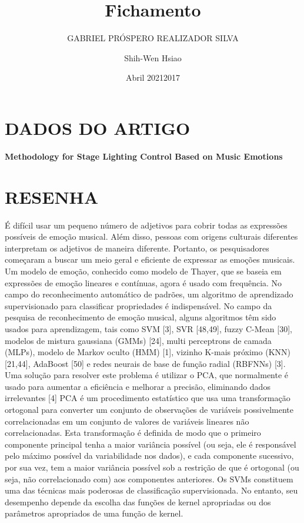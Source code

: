 \documentclass{article}
\title{Fichamento}
\author{GABRIEL PRÓSPERO REALIZADOR  SILVA}
\date{Abril 2021}
\begin{document}
\maketitle

\section{DADOS DO ARTIGO}
\textbf{Methodology for Stage Lighting Control Based on Music Emotions \\}
\author{Shih-Wen Hsiao\\}
\date{2017}

\section{RESENHA}
É difícil usar um pequeno número de adjetivos para cobrir todas as expressões possíveis de emoção musical. 
Além disso, pessoas com origens culturais diferentes interpretam os adjetivos de maneira diferente. 
Portanto, os pesquisadores começaram a buscar um meio geral e eficiente de expressar as emoções musicais. 
Um modelo de emoção, conhecido como modelo de Thayer, que se baseia em expressões de emoção lineares e contínuas, agora é usado com frequência.
No campo do reconhecimento automático de padrões, um algoritmo de aprendizado supervisionado para classificar propriedades é indispensável. 
No campo da pesquisa de reconhecimento de emoção musical, alguns algoritmos têm sido usados ​​para aprendizagem, tais como SVM [3], SVR [48,49], fuzzy C-Mean [30], modelos de mistura gaussiana (GMMs) [24], multi perceptrons de camada (MLPs), modelo de Markov oculto (HMM) [1], vizinho K-mais próximo (KNN) [21,44], AdaBoost [50] e redes neurais de base de função radial (RBFNNs) [3].
Uma solução para resolver este problema é utilizar o PCA, que normalmente é usado para aumentar a eficiência e melhorar a precisão, eliminando dados irrelevantes [4]
PCA é um procedimento estatístico que usa uma transformação ortogonal para converter um conjunto de observações de variáveis ​​possivelmente correlacionadas em um conjunto de valores de variáveis ​​lineares não correlacionadas.
Esta transformação é definida de modo que o primeiro componente principal tenha a maior variância possível (ou seja, ele é responsável pelo máximo possível da variabilidade nos dados), e cada componente sucessivo, por sua vez, tem a maior variância possível sob a restrição de que é ortogonal (ou seja, não correlacionado com) aos componentes anteriores.
Os SVMs constituem uma das técnicas mais poderosas de classificação supervisionada. No entanto, seu desempenho depende da escolha das funções de kernel apropriadas ou dos parâmetros apropriados de uma função de kernel.
\end{document}

